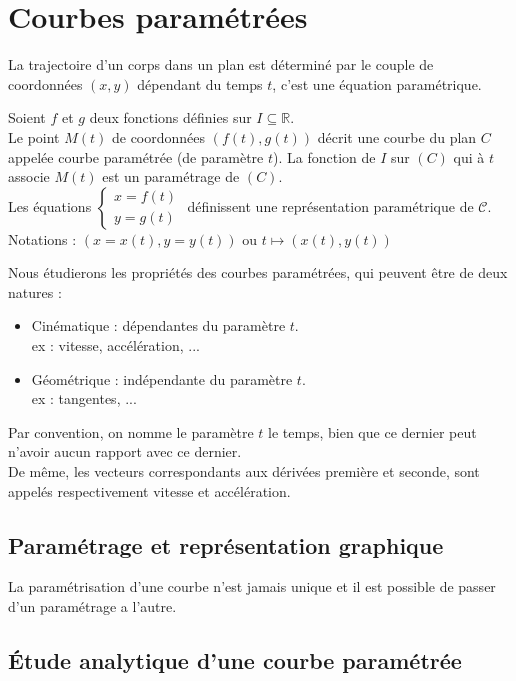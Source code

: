 \chapter{Courbes paramétrées}
La trajectoire d'un corps dans un plan est déterminé par le couple de coordonnées $(x,y)$ dépendant du temps $t$, c'est une équation paramétrique.
\begin{defi}
Soient $f$ et $g$ deux fonctions définies sur $I\subseteq
\mathbb{R}$.\\
Le point $M(t)$ de coordonnées $(f(t),g(t))$ décrit une courbe du plan $C$ appelée courbe paramétrée (de paramètre $t$).
La fonction de $I$ sur $(C)$ qui à $t$ associe $M(t)$ est un paramétrage de $(C)$.\\
Les équations $\begin{cases}x=f(t)\\y=g(t)\end{cases}$ définissent une représentation paramétrique de $\mathscr{C}$.\\
Notations : $(x=x(t),y=y(t))$ ou $t\mapsto(x(t),y(t))$
\end{defi}
Nous étudierons les propriétés des courbes paramétrées, qui peuvent être de deux natures :
\begin{itemize}
    \item Cinématique : dépendantes du paramètre $t$.\\
    ex : vitesse, accélération, ...
    \item Géométrique : indépendante du paramètre $t$.\\
    ex : tangentes, ...
\end{itemize}
\begin{rmq}
Par convention, on nomme le paramètre $t$ le temps, bien que ce dernier peut n'avoir aucun rapport avec ce dernier.\\
De même, les vecteurs correspondants aux dérivées première et seconde, sont appelés respectivement vitesse et accélération.
\end{rmq}
\section{Paramétrage et représentation graphique}
La paramétrisation d'une courbe n'est jamais unique et il est possible de passer d'un paramétrage a l'autre.
\section{Étude analytique d'une courbe paramétrée}

